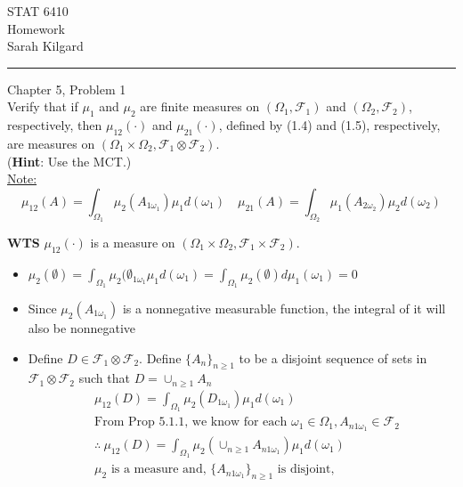 \documentclass[12pt,letterpaper, onecolumn]{exam}
\newcommand{\calF}{\mathcal{F}}
\begin{document}
\begingroup  
    \centering
    \LARGE STAT 6410\\
    \LARGE Homework \\[0.5em]
    \large Sarah Kilgard\par
\endgroup
\rule{\textwidth}{0.4pt}
\pointsdroppedatright   %
\printanswers
\renewcommand{\solutiontitle}{\noindent\textbf{Ans:}\enspace}   %

\begin{questions}
    \question Chapter 5, Problem 1 \\
    Verify that if $\mu_1$ and $\mu_2$ are finite measures on $(\Omega_1, \calF_1)$ and $(\Omega_2, \calF_2)$, respectively, then $\mu_{12}(\cdot)$ and $\mu_{21}(\cdot)$, defined by (1.4) and (1.5), respectively, are measures on $(\Omega_1  \times  \Omega_2, \calF_1  \otimes \calF_2)$. \\ (\textbf{Hint}: Use the MCT.) \\
    \underline{Note:}
    \[\mu_{12}(A) = \int_{\Omega_1} \mu_2(A_{1\omega_1})\mu_1 d(\omega_1) \quad \mu_{21}(A) = \int_{\Omega_2} \mu_1(A_{2\omega_2})\mu_2 d(\omega_2)\]
    \begin{solution}
        \textbf{WTS} $\mu_{12}(\cdot)$ is a measure on $(\Omega_1  \times  \Omega_2, \calF_1  \times \calF_2)$.
        \begin{itemize}
            \item $\mu_2(\emptyset) = \int_{\Omega_1} \mu_2(\emptyset_{1 \omega_1} \mu_1 d(\omega_1) = \int_{\Omega_1} \mu_2(\emptyset) d\mu_1(\omega_1) = 0$
            \item Since $\mu_2(A_{1\omega_1})$ is a nonnegative measurable function, the integral of it will also be nonnegative
            \item Define $D \in \calF_1 \otimes \calF_2$. Define $\{A_n\}_{n \geq 1}$ to be a disjoint sequence of sets in $\calF_1 \otimes \calF_2$ such that $D = \cup_{n\geq1}A_n$
            \begin{align*}
                & \mu_{12}(D) = \int_{\Omega_1}\mu_2(D_{1\omega_1})\mu_1d(\omega_1) \\
                & \textrm{From Prop 5.1.1, we know for each } \omega_1 \in \Omega_1, A_{n 1 \omega_1} \in \calF_2 \\
                & \therefore \: \mu_{12}(D) = \int_{\Omega_1}\mu_2(\cup_{n\geq 1} A_{n 1 \omega_1})\mu_1d(\omega_1) \\ 
                & \mu_2 \textrm{ is a measure and, } \{A_{n 1 \omega_1}\}_{n \geq 1} \textrm{ is disjoint, } \\

\end{align*}
\end{itemize}
\end{solution}
\end{questions}
\end{document}

